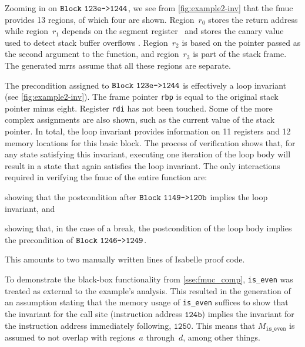 Zooming in on $\texttt{Block}~\mathtt{123e\texttt{->}1244}$, we see from \cref{fig:example2-inv}
that the \ac{fmuc} provides 13 regions, of which four are shown.
Region~$r_0$ stores the return address
while region~$r_1$ depends on the segment register~
and stores the canary value
used to detect stack buffer overflows \autocite{cowan1998stackguard}.%
Region~$r_2$ is based on the pointer passed as the second argument to the function,
and region~$r_3$ is part of the stack frame.
The generated \acp{mrr} assume that all these regions are separate.

The precondition assigned to $\texttt{Block}~\mathtt{123e\texttt{->}1244}$
is effectively a loop invariant (see \cref{fig:example2-inv}).%
The frame pointer \lstinline|rbp|%
is equal to the original stack pointer minus eight.%
Register \lstinline|rdi| has not been touched.
Some of the more complex assignments are also shown,
such as the current value of the stack pointer.
In total, the loop invariant provides information
on 11 registers and 12 memory locations for this basic block.%
The process of verification shows that,
for any state satisfying this invariant,
executing one iteration of the loop body
will result in a state that again satisfies the loop invariant.
The only interactions required in verifying the \ac{fmuc} of the entire function are:
\begin{enumerate*}
  \item showing that the postcondition after $\texttt{Block}~\mathtt{1149\texttt{->}120b}$
  implies the loop invariant, and
  \item showing that, in the case of a break, the postcondition of the loop body
  implies the precondition of $\texttt{Block}~\mathtt{1246\texttt{->}1249}$.
\end{enumerate*}
This amounts to two manually written lines of Isabelle proof code.

To demonstrate the black-box functionality from \cref{sse:fmuc_comp},
\lstinline|is_even| was treated as external to the example's analysis.
This resulted in the generation of an assumption
stating that the memory usage of \lstinline|is_even| suffices to show that
the invariant for the call site (instruction address $\mathtt{124b}$)
implies the invariant for the instruction address immediately following,
$\mathtt{1250}$.
This means that $M_\mathtt{is\_even}$
is assumed to not overlap with regions~$a$ through~$d$, among other things.

